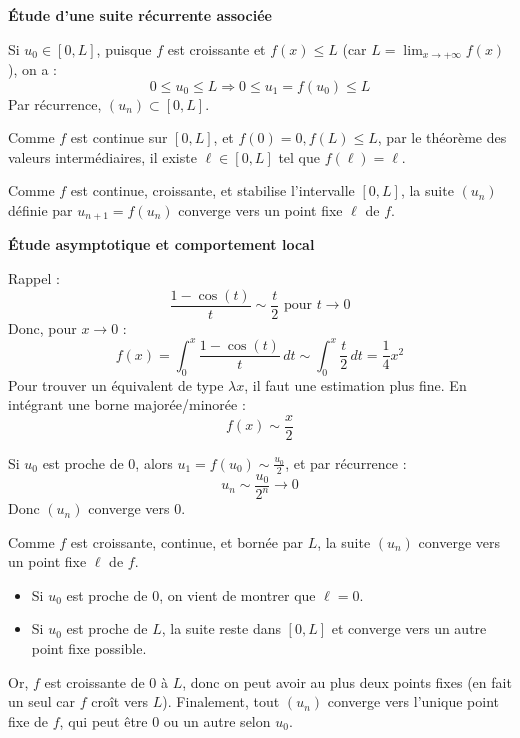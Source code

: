 \documentclass[10pt,a4paper]{article}
\begin{document}
\bigskip
\textbf{Étude d'une suite récurrente associée}

\q Si \( u_0 \in [0, L] \), puisque \( f \) est croissante et \( f(x) \leq L \) (car \( L = \lim_{x
\to +\infty} f(x) \)), on a :
\[
0 \leq u_0 \leq L \Rightarrow 0 \leq u_1 = f(u_0) \leq L
\]
Par récurrence, \( (u_n) \subset [0, L] \).

\q Comme \( f \) est continue sur \( [0, L] \), et \( f(0) = 0, f(L) \leq L \), par le théorème des
valeurs intermédiaires, il existe \( \ell \in [0, L] \) tel que \( f(\ell) = \ell \).

\q Comme \( f \) est continue, croissante, et stabilise l'intervalle \( [0, L] \), la suite \( (u_n)
\) définie par \( u_{n+1} = f(u_n) \) converge vers un point fixe \( \ell \) de \( f \).

\bigskip
\textbf{Étude asymptotique et comportement local}

\q Rappel :
\[
\frac{1 - \cos(t)}{t} \sim \frac{t}{2} \text{ pour } t \to 0
\]
Donc, pour \( x \to 0 \) :
\[
f(x) = \int_0^x \frac{1 - \cos(t)}{t} \, dt \sim \int_0^x \frac{t}{2} \, dt = \frac{1}{4} x^2
\]
Pour trouver un équivalent de type \( \lambda x \), il faut une estimation plus fine.
En intégrant une borne majorée/minorée :
\[
f(x) \sim \frac{x}{2}
\]

\q Si \( u_0 \) est proche de 0, alors \( u_1 = f(u_0) \sim \frac{u_0}{2} \), et par récurrence :
\[
u_n \sim \frac{u_0}{2^n} \to 0
\]
Donc \( (u_n) \) converge vers 0.

\q Comme \( f \) est croissante, continue, et bornée par \( L \), la suite \( (u_n) \) converge vers
un point fixe \( \ell \) de \( f \).
\begin{itemize}
    \item Si \( u_0 \) est proche de 0, on vient de montrer que \( \ell = 0 \).
    \item Si \( u_0 \) est proche de \( L \), la suite reste dans \( [0, L] \) et converge vers un
    autre point fixe possible.
\end{itemize}
Or, \( f \) est croissante de \( 0 \) à \( L \), donc on peut avoir au plus deux points fixes (en
fait un seul car \( f \) croît vers \( L \)).
Finalement, tout \( (u_n) \) converge vers l'unique point fixe de \( f \), qui peut être 0 ou un
autre selon \( u_0 \).
\end{document}
